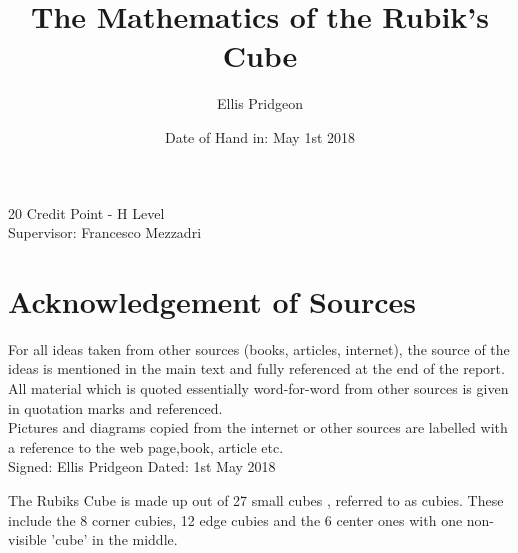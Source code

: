 \documentclass{article}
\author{Ellis Pridgeon}
\title{The Mathematics of the Rubik's Cube}\vspace{-50pt}
\date{Date of Hand in: May 1st 2018}
\begin{document}
\maketitle
\begin{center}
20 Credit Point - H Level\\ 
Supervisor: Francesco Mezzadri
\end{center}
\newpage
\section{Acknowledgement of Sources}
\begin{center}
For all ideas taken from other sources (books, articles, internet), the source of the ideas is mentioned in the main text and fully referenced at the end of the report.\\
All material which is quoted essentially word-for-word from other sources is given in quotation marks and referenced.\\
Pictures and diagrams copied from the internet or other sources are labelled with a reference to the web page,book, article etc.\\

Signed: Ellis Pridgeon
Dated: 1st May 2018
\end{center}
\newpage
\tableofcontents
\newpage
\medskip
The Rubiks Cube is made up out of 27 small cubes , referred to as cubies. These include the 8 corner cubies, 12 edge cubies and the 6 center ones with one non-visible 'cube' in the middle.
\begin{figure}[h]
{
	\hspace{-10cm}
}
\end{figure}
\end{document}
